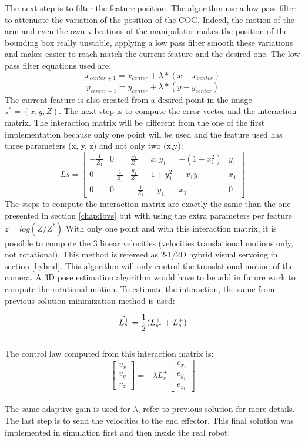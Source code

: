 The next step is to filter the feature position. The algorithm use a low pass filter to attenuate the variation of the position of the \gls{COG}. Indeed, the motion of the arm and even the own vibrations of the manipulator makes the position of the bounding box really unstable, applying a low pass filter smooth these variations and makes easier to reach match the current feature and the desired one.
The low pass filter equations used are:
\[
    x_{center+1} = x_{center} + \lambda*(x - x_{center}) 
\]
\[
    y_{center + 1} = y_{center} + \lambda*(y - y_{center})
\]
The current feature is also created from a desired point in the image $s^*=(x, y, Z)$. The next step is to compute the error vector and the interaction matrix. The interaction matrix will be different from the one of the first implementation because only one point will be used and the feature used has three parameters (x, y, z) and not only two (x,y):
\[ 
Ls
=
\begin{bmatrix}
    - \frac{1}{Z_1} & 0 & \frac{x_1}{Z_1} & x_1 y_1 & -(1+x_1^2) & y_1 \\
    0 & - \frac{1}{Z_1} & \frac{y_1}{Z_1} & 1+y_1^2 & - x_1 y_1 & x_1  \\
    0 & 0 &  - \frac{1}{Z_1} & -y_1 & x_1 & 0
\end{bmatrix}
\]
The steps to compute the interaction matrix are exactly the same than the one presented in section \ref{chap:ibvs} but with using the extra parameters per feature $ z = log(Z/Z^*)$
With only one point and with this interaction matrix, it is possible to compute the 3 linear velocities (velocities translational motions only, not rotational). This method is refereed as 2-1/2D hybrid visual servoing in section \ref{hybrid}. This algorithm will only control the translational motion of the camera. A 3D pose estimation algorithm would have to be add in future work to compute the rotational motion.
To estimate the interaction, the same from previous solution minimization method is used:

\[
\Hat{L_s^+} = \frac{1}{2}(L_{s^*}^+ + L_s^+)
\]\\

The control law computed from this interaction matrix is:
\begin{equation}
\begin{bmatrix}
    v_x \\
    v_y \\
    v_z 
\end{bmatrix}
= - \lambda L_{s}^+ 
\begin{bmatrix}
    e_{x_1} \\
    e_{y_1} \\
    e_{z_1}
\end{bmatrix}
\end{equation} \\
The same adaptive gain is used for $\lambda$, refer to previous solution for more details. 
The last step is to send the velocities to the end effector. 
This final solution was implemented in simulation first and then inside the real robot.\\

